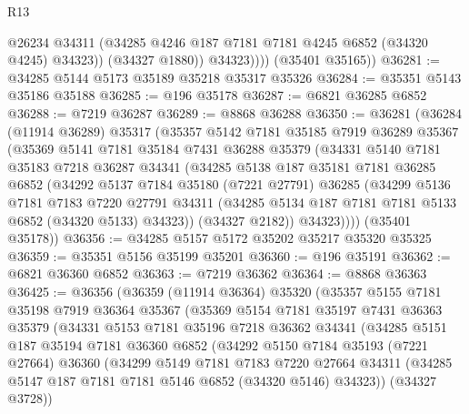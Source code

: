 \begin{lexlean}{R13}
\begin{coremodule}
                  @26234
                  @34311
                  (@34285 @4246 @187 @7181 @7181 @4245 @6852 (@34320 @4245) @34323))
                (@34327 @1880))
              @34323))))
      (@35401 @35165))
@36281 := @34285 @5144 @5173 @35189 @35218 @35317 @35326
@36284 := @35351 @5143 @35186 @35188
@36285 := @196 @35178
@36287 := @6821 @36285 @6852
@36288 := @7219 @36287
@36289 := @8868 @36288
@36350 := @36281
    (@36284
      (@11914 @36289)
      @35317
      (@35357
        @5142
        @7181
        @35185
        @7919
        @36289
        @35367
        (@35369
          @5141
          @7181
          @35184
          @7431
          @36288
          @35379
          (@34331
            @5140
            @7181
            @35183
            @7218
            @36287
            @34341
            (@34285
              @5138
              @187
              @35181
              @7181
              @36285
              @6852
              (@34292
                @5137
                @7184
                @35180
                (@7221 @27791)
                @36285
                (@34299
                  @5136
                  @7181
                  @7183
                  @7220
                  @27791
                  @34311
                  (@34285 @5134 @187 @7181 @7181 @5133 @6852 (@34320 @5133) @34323))
                (@34327 @2182))
              @34323))))
      (@35401 @35178))
@36356 := @34285 @5157 @5172 @35202 @35217 @35320 @35325
@36359 := @35351 @5156 @35199 @35201
@36360 := @196 @35191
@36362 := @6821 @36360 @6852
@36363 := @7219 @36362
@36364 := @8868 @36363
@36425 := @36356
    (@36359
      (@11914 @36364)
      @35320
      (@35357
        @5155
        @7181
        @35198
        @7919
        @36364
        @35367
        (@35369
          @5154
          @7181
          @35197
          @7431
          @36363
          @35379
          (@34331
            @5153
            @7181
            @35196
            @7218
            @36362
            @34341
            (@34285
              @5151
              @187
              @35194
              @7181
              @36360
              @6852
              (@34292
                @5150
                @7184
                @35193
                (@7221 @27664)
                @36360
                (@34299
                  @5149
                  @7181
                  @7183
                  @7220
                  @27664
                  @34311
                  (@34285 @5147 @187 @7181 @7181 @5146 @6852 (@34320 @5146) @34323))
                (@34327 @3728))

\end{coremodule}
\end{lexlean}

